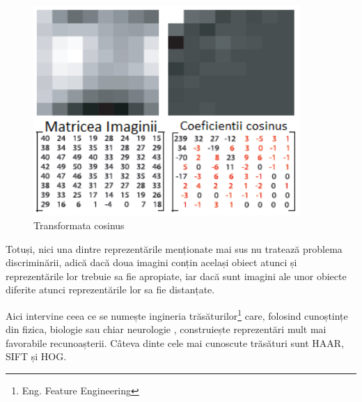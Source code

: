 \begin{figure}[H]
	\centering
		\includegraphics[width=0.90\textwidth]{imagini/take_DCT.png}
	\caption{Transformata cosinus\footnotemark}
	\label{fig:take_DCT}
\end{figure}


Totuși, nici una dintre reprezentările menționate mai sus nu tratează problema discriminării, adică dacă doua imagini conțin același obiect atunci și reprezentările lor trebuie sa fie apropiate, iar dacă sunt imagini ale unor obiecte diferite atunci reprezentările lor sa fie distanțate.

Aici intervine ceea ce se numește ingineria trăsăturilor\footnote{Eng. Feature Engineering} care, folosind cunoștințe din fizica, biologie sau chiar neurologie , construiește reprezentări mult mai favorabile recunoașterii.
Câteva dinte cele mai cunoscute trăsături sunt HAAR\cite{Viola01robustreal-time}, SIFT\cite{Lowe99objectrecognition} și HOG\cite{Dalal05histogramsof}.

